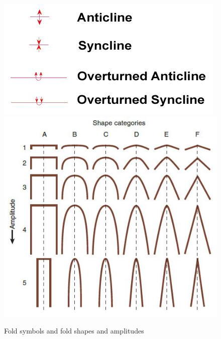 \documentclass[12pt,a4paper]{report}
\begin{document}
\begin{figure}[h]
  \includegraphics[scale=0.60]{fold-symbols.jpg}
  \includegraphics[scale=0.40]{fold-categories.jpg}
  \centering
  \caption{Fold symbols and fold shapes and amplitudes}
\end{figure}
\end{document}
